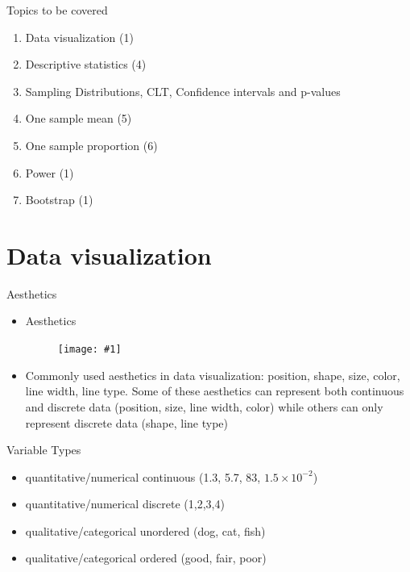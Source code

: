 \documentclass{beamer}\usepackage[]{graphicx}\usepackage[]{color}
\newcommand {\framedgraphic}[1] {
	\begin{figure}
		\centering
		\texttt{[image: \#1]}
	\end{figure}
}
\begin{document}
\begin{frame}{Topics to be covered}

\begin{enumerate}
	\setlength\itemsep{.51em}
	\item Data visualization (1)
	\item Descriptive statistics (4)
	\item Sampling Distributions, CLT, Confidence intervals and p-values 
	\item One sample mean (5)
	\item One sample proportion (6)
	\item Power (1)
	\item Bootstrap (1)
\end{enumerate}

\end{frame}

\section{Data visualization}

\begin{frame}{Aesthetics}
\begin{itemize}
	\setlength\itemsep{.51em}
	\item Aesthetics
		\framedgraphic{scales.jpg}
		\pause 
	\item Commonly used aesthetics in data visualization: position, shape, size, color, line width, line type. Some of these aesthetics can represent both continuous and discrete data (position, size, line width, color) while others can only represent discrete data (shape, line type)	
\end{itemize}
\end{frame}



\begin{frame}{Variable Types}
\begin{itemize}
	\setlength\itemsep{1.5em}
	\item quantitative/numerical continuous (1.3, 5.7, 83, $1.5\times 10^{-2}$)
	\item quantitative/numerical discrete (1,2,3,4)
	\item qualitative/categorical unordered (dog, cat, fish)
	\item qualitative/categorical ordered (good, fair, poor)
\end{itemize}



\end{frame}
\end{document}
